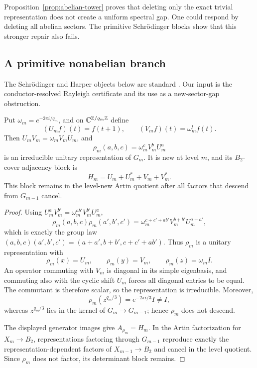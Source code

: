 Proposition~\ref{prop:abelian-tower} proves that deleting only the exact
trivial representation does not create a uniform spectral gap. One could
respond by deleting all abelian sectors. The primitive Schrödinger blocks
show that this stronger repair also fails.

\subsection{A primitive nonabelian branch}

The Schrödinger and Harper objects below are standard
\citep{dedeo2003spectra,beguin1997harper}. Our input is the
conductor-resolved Rayleigh certificate and its use as a new-sector-gap
obstruction.

\begin{lemma}
\label{lem:schrodinger-sector}
Put \(\omega_m=e^{-2\pi i/q_m}\), and on
\(\mathbb{C}^{\mathbb{Z}/q_m\mathbb{Z}}\) define
\[
(U_mf)(t)=f(t+1),\qquad (V_mf)(t)=\omega_m^t f(t).
\]
Then \(U_mV_m=\omega_mV_mU_m\), and
\[
\rho_m(a,b,c)=\omega_m^cV_m^bU_m^a
\]
is an irreducible unitary representation of \(G_m\). It is new at level
\(m\), and its \(B_2\)-cover adjacency block is
\[
H_m=U_m+U_m^*+V_m+V_m^*.
\]
This block remains in the level-new Artin quotient after all factors that
descend from \(G_{m-1}\) cancel.
\end{lemma}

\begin{proof}
Using \(U_m^aV_m^{b'}=\omega_m^{ab'}V_m^{b'}U_m^a\),
\[
\rho_m(a,b,c)\rho_m(a',b',c')
=\omega_m^{c+c'+ab'}V_m^{b+b'}U_m^{a+a'},
\]
which is exactly the group law
\((a,b,c)(a',b',c')=(a+a',b+b',c+c'+ab')\). Thus \(\rho_m\) is a unitary
representation with
\[
\rho_m(x)=U_m,\qquad \rho_m(y)=V_m,\qquad
\rho_m(z)=\omega_m I.
\]
An operator commuting with \(V_m\) is diagonal in its simple eigenbasis, and
commuting also with the cyclic shift \(U_m\) forces all diagonal entries to
be equal. The commutant is therefore scalar, so the representation is
irreducible. Moreover,
\[
\rho_m(z^{q_m/3})=e^{-2\pi i/3}I\ne I,
\]
whereas \(z^{q_m/3}\) lies in the kernel of \(G_m\to G_{m-1}\); hence
\(\rho_m\) does not descend.

The displayed generator images give \(A_{\rho_m}=H_m\). In the Artin
factorization for \(X_m\to B_2\), representations factoring through
\(G_{m-1}\) reproduce exactly the representation-dependent factors of
\(X_{m-1}\to B_2\) and cancel in the level quotient. Since \(\rho_m\) does
not factor, its determinant block remains.
\end{proof}

